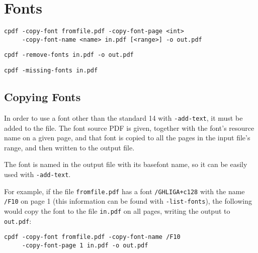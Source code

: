 \documentclass{book}
\begin{document}
\pagestyle{empty}

\chapter{Fonts}\pagestyle{fancy}
 {\small \begin{framed}
  \noindent\verb!cpdf -copy-font fromfile.pdf -copy-font-page <int>!\\
  \noindent\verb!     -copy-font-name <name> in.pdf [<range>] -o out.pdf!

  \vspace{1.5mm}
  \noindent\verb!cpdf -remove-fonts in.pdf -o out.pdf!

  \vspace{1.5mm}
  \noindent\verb!cpdf -missing-fonts in.pdf!
  \end{framed}}
\section{Copying Fonts}
\label{copyfont}

In order to use a font other than the standard 14 with \verb!-add-text!, it
must be added to the file. The font source PDF is given, together with the
font's resource name on a given page, and that font is copied to all the pages
in the input file's range, and then written to the output file.

The font is named in the output file with its basefont name, so it can be
easily used with \verb!-add-text!.

For example, if the file \verb!fromfile.pdf! has a font \verb!/GHLIGA+c128! with
the name \verb!/F10! on page 1 (this information can be found with
\verb!-list-fonts!), the following would copy the font to the file
\verb!in.pdf! on all pages, writing the output to \verb!out.pdf!:
  \begin{framed}
  \small\noindent\verb!cpdf -copy-font fromfile.pdf -copy-font-name /F10!\\
  \small\noindent\verb!     -copy-font-page 1 in.pdf -o out.pdf!
  \end{framed}
\end{document}
